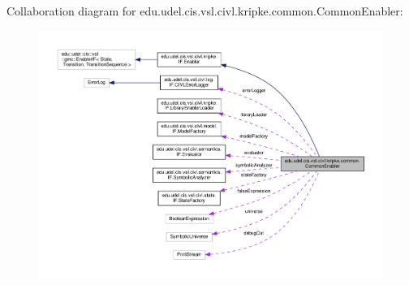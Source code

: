 Collaboration diagram for edu.\+udel.\+cis.\+vsl.\+civl.\+kripke.\+common.\+Common\+Enabler\+:
\nopagebreak
\begin{figure}[H]
\begin{center}
\leavevmode
\includegraphics[width=350pt]{classedu_1_1udel_1_1cis_1_1vsl_1_1civl_1_1kripke_1_1common_1_1CommonEnabler__coll__graph}
\end{center}
\end{figure}
